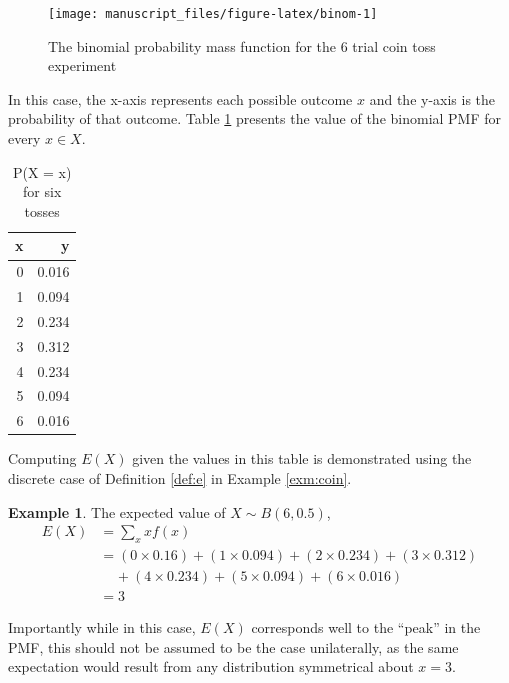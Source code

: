 \documentclass[
  12pt,
]{book}
\theoremstyle{definition}
\theoremstyle{definition}
\newtheorem{example}{Example}[chapter]
\theoremstyle{definition}
\theoremstyle{remark}
\begin{document}
\begin{figure}

{\centering \texttt{[image: manuscript\_files/figure-latex/binom-1]} 

}

\caption{The binomial probability mass function for the 6 trial coin toss experiment}\label{fig:binom}
\end{figure}

In this case, the x-axis represents each possible outcome \(x\) and the y-axis is the probability of that outcome. Table \ref{tab:bino} presents the value of the binomial PMF for every \(x \in X\).

\begin{table}[!h]

\caption{\label{tab:bino}P(X = x) for six tosses}
\centering
\begin{tabular}[t]{rr}
\toprule
x & y\\
\midrule
0 & 0.016\\
1 & 0.094\\
2 & 0.234\\
3 & 0.312\\
4 & 0.234\\
5 & 0.094\\
6 & 0.016\\
\bottomrule
\end{tabular}
\end{table}

Computing \(E(X)\) given the values in this table is demonstrated using the discrete case of Definition \ref{def:e} in Example \ref{exm:coin}.

\begin{example}
\protect\hypertarget{exm:coin}{}{\label{exm:coin} }The expected value of \(X \sim B(6, 0.5)\),
\[\begin{split}
E(X) & = \sum_{x}xf(x) \\
  & =  (0 \times 0.16)+(1 \times 0.094)+(2 \times 0.234)+(3 \times 0.312)\\
  & \;\;\;\; +(4 \times 0.234)+(5 \times 0.094)+(6 \times 0.016)\\
  & = 3
\end{split}\]
\end{example}

Importantly while in this case, \(E(X)\) corresponds well to the ``peak'' in the PMF, this should not be assumed to be the case unilaterally, as the same expectation would result from any distribution symmetrical about \(x=3\).
\end{document}
